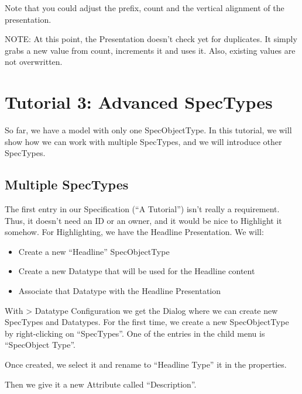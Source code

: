Note that you could adjust the prefix, count and the vertical alignment of the presentation.

NOTE: At this point, the Presentation doesn't check yet for duplicates.  It simply grabs a new value from count, increments it and uses it.  Also, existing values are not overwritten.

\section{Tutorial 3: Advanced SpecTypes}

So far, we have a model with only one SpecObjectType.  In this tutorial, we will show how we can work with multiple SpecTypes, and we will introduce other SpecTypes.

\subsection{Multiple SpecTypes}

The first entry in our Specification (``A \pror{} Tutorial'') isn't really a requirement.  Thus, it doesn't need an ID or an owner, and it would be nice to Highlight it somehow.  For Highlighting, we have the Headline Presentation.  We will:

\begin{itemize}

\item
  Create a new ``Headline'' SpecObjectType
\item
  Create a new Datatype that will be used for the Headline content
\item
  Associate that Datatype with the Headline Presentation
\end{itemize}

With \pror{} \textgreater{} Datatype Configuration we get the Dialog where we can create new SpecTypes and Datatypes.  For the first time, we create a new SpecObjectType by right-clicking on ``SpecTypes''.  One of the entries in the child menu is ``SpecObject Type''.

Once created, we select it and rename to ``Headline Type'' it in the properties.

Then we give it a new Attribute called ``Description''.


